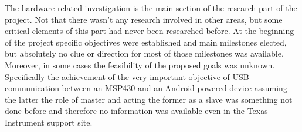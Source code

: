 	The hardware related investigation is the main section of the research part of the project. Not that there wasn't any research involved in other areas, but some critical elements of this part had never been researched before. 
	At the beginning of the project specific objectives were established and main milestones elected, but absolutely no clue or direction for most of those milestones was available.
	Moreover, in some cases the feasibility of the proposed goals was unknown. Specifically the achievement of the very important objective of USB communication between an MSP430 %
	and an Android powered device assuming the latter the role of master and acting the former as a slave was something not done before and therefore no information was available  even in the Texas Instrument support site.\\



